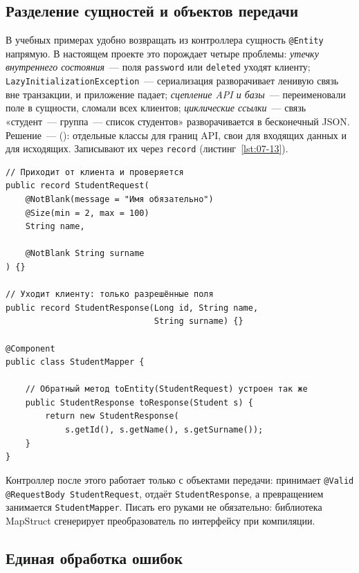 \subsection{Разделение сущностей и объектов передачи}

В учебных примерах удобно возвращать из контроллера сущность \texttt{@Entity}
напрямую. В настоящем проекте это порождает четыре проблемы: \emph{утечку
внутреннего состояния}~--- поля \texttt{password} или \texttt{deleted} уходят
клиенту; \texttt{LazyInitializationException}~--- сериализация разворачивает
ленивую связь вне транзакции, и приложение падает; \emph{сцепление API и
базы}~--- переименовали поле в сущности, сломали всех клиентов;
\emph{циклические ссылки}~--- связь «студент~--- группа~--- список студентов»
разворачивается в бесконечный JSON. Решение~--- 
(): отдельные классы для границ API, свои для
входящих данных и для исходящих. Записывают их через \texttt{record}
(листинг~\ref{lst:07-13}).

\begin{listing}[H]
\begin{verbatim}
// Приходит от клиента и проверяется
public record StudentRequest(
    @NotBlank(message = "Имя обязательно")
    @Size(min = 2, max = 100)
    String name,

    @NotBlank String surname
) {}

// Уходит клиенту: только разрешённые поля
public record StudentResponse(Long id, String name,
                              String surname) {}

@Component
public class StudentMapper {

    // Обратный метод toEntity(StudentRequest) устроен так же
    public StudentResponse toResponse(Student s) {
        return new StudentResponse(
            s.getId(), s.getName(), s.getSurname());
    }
}
\end{verbatim}
\caption{Объекты передачи данных и преобразователь}
\label{lst:07-13}
\end{listing}

Контроллер после этого работает только с объектами передачи: принимает
\texttt{@Valid @RequestBody StudentRequest}, отдаёт \texttt{StudentResponse}, а
превращением занимается \texttt{StudentMapper}. Писать его руками не
обязательно: библиотека MapStruct сгенерирует преобразователь по интерфейсу
при компиляции.

\subsection{Единая обработка ошибок}

